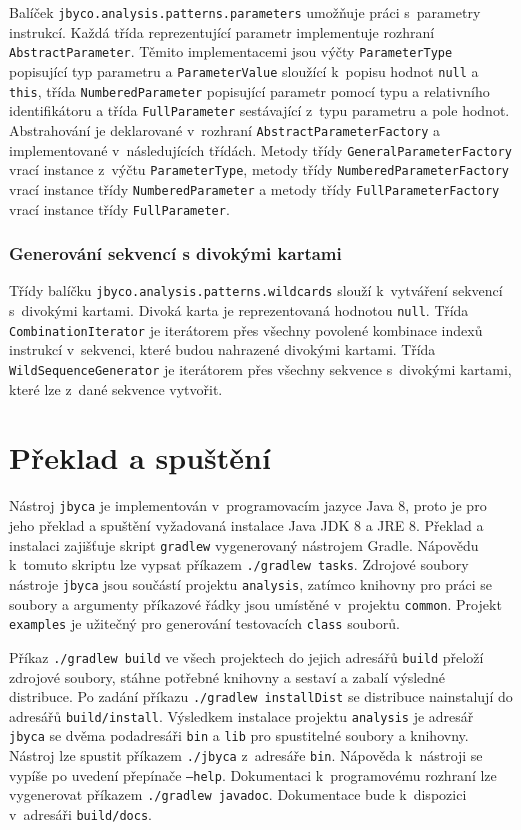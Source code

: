 Balíček \texttt{jbyco.analysis.patterns.parameters} umožňuje práci s~parametry instrukcí. Každá třída reprezentující parametr implementuje rozhraní \texttt{AbstractParameter}. Těmito implementacemi jsou výčty \texttt{ParameterType} popisující typ parametru a \texttt{ParameterValue} sloužící k~popisu hodnot \texttt{null} a \texttt{this}, třída \texttt{NumberedParameter} popisující parametr pomocí typu a relativního identifikátoru a třída \texttt{FullParameter} sestávající z~typu parametru a pole hodnot. Abstrahování je deklarované v~rozhraní \texttt{AbstractParameterFactory} a implementované v~následujících třídách. Metody třídy \texttt{GeneralParameterFactory} vrací instance z~výčtu \texttt{ParameterType}, metody třídy \texttt{NumberedParameterFactory} vrací instance třídy \texttt{NumberedParameter} a metody třídy \texttt{FullParameterFactory} vrací instance třídy \texttt{FullParameter}.

\subsubsection{Generování sekvencí s divokými kartami}

Třídy balíčku \texttt{jbyco.analysis.patterns.wildcards} slouží k~vytváření sekvencí s~divokými kartami. Divoká karta je reprezentovaná hodnotou \texttt{null}. Třída \texttt{CombinationIterator} je iterátorem přes všechny povolené kombinace indexů instrukcí v~sekvenci, které budou nahrazené divokými kartami. Třída \texttt{WildSequenceGenerator} je iterátorem přes všechny sekvence s~divokými kartami, které lze z~dané sekvence vytvořit.

\section{Překlad a spuštění}\label{Jbyca:Run}

Nástroj \texttt{jbyca} je implementován v~programovacím jazyce Java 8, proto je pro jeho překlad a spuštění vyžadovaná instalace Java JDK 8 a JRE 8.
Překlad a instalaci zajišťuje skript \texttt{gradlew} vygenerovaný nástrojem Gradle. Nápovědu k~tomuto skriptu lze vypsat příkazem \texttt{./gradlew tasks}. 
Zdrojové soubory nástroje \texttt{jbyca} jsou součástí projektu \texttt{analysis}, zatímco knihovny pro práci se soubory a argumenty příkazové řádky jsou umístěné v~projektu \texttt{common}. Projekt \texttt{examples} je užitečný pro generování testovacích \texttt{class} souborů.

Příkaz \texttt{./gradlew build} ve všech projektech do jejich adresářů \texttt{build} přeloží zdrojové soubory, stáhne potřebné knihovny a sestaví a zabalí výsledné distribuce. Po zadání příkazu \texttt{./gradlew installDist} se distribuce nainstalují do adresářů \texttt{build/install}. Výsledkem instalace projektu \texttt{analysis} je adresář \texttt{jbyca} se dvěma podadresáři \texttt{bin} a \texttt{lib} pro spustitelné soubory a knihovny. Nástroj lze spustit příkazem \texttt{./jbyca} z~adresáře \texttt{bin}. Nápověda k~nástroji se vypíše po uvedení přepínače \texttt{---help}. Dokumentaci k~programovému rozhraní lze vygenerovat příkazem \texttt{./gradlew javadoc}. Dokumentace bude k~dispozici v~adresáři \texttt{build/docs}.

